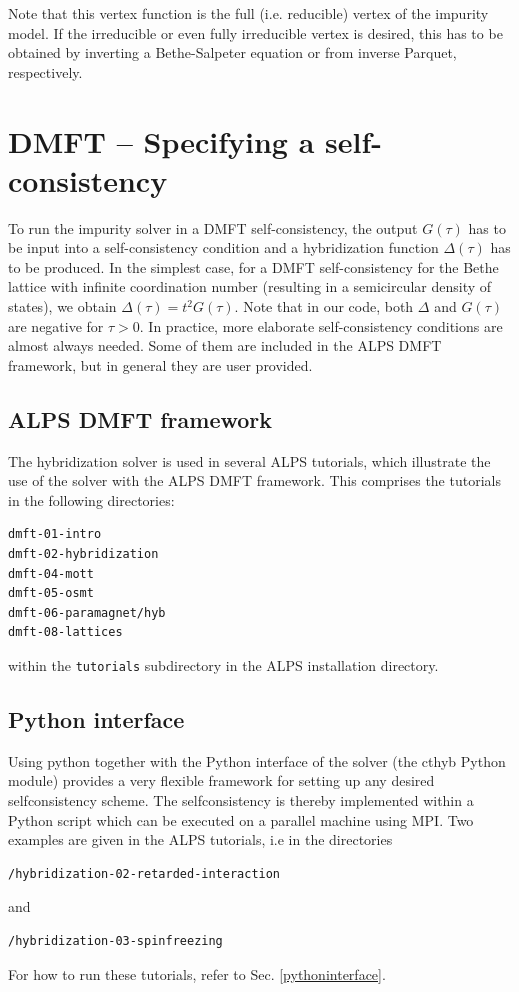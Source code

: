 \documentclass[aps,prb,floatfix,superscriptaddress,twocolumn,notitlepage]{revtex4-1}
\begin{document}
Note that this vertex function is the full (i.e. reducible) vertex of the impurity model. If the irreducible or even fully irreducible vertex is desired, this has to be obtained by inverting a Bethe-Salpeter equation or from inverse Parquet, respectively.

\section{DMFT -- Specifying a self-consistency}
To run the impurity solver in a DMFT self-consistency, the output $G(\tau)$ has to be input into a self-consistency condition and a hybridization function $\Delta(\tau)$ has to be produced.\cite{Georges96,Kotliar06} In the simplest case, for a DMFT self-consistency for the Bethe lattice with infinite coordination number (resulting in a semicircular density of states), we obtain $\Delta(\tau)=t^2G(\tau)$.
Note that in our code, both $\Delta$ and $G(\tau)$ are negative for $\tau>0$.
In practice, more elaborate self-consistency conditions are almost always needed. 
Some of them are included in the ALPS DMFT framework, but in general they are user provided.

\subsection{ALPS DMFT framework}

The hybridization solver is used in several ALPS tutorials, which illustrate the use of the solver with the ALPS DMFT framework. This comprises the tutorials in the following directories:
\begin{verbatim}
dmft-01-intro
dmft-02-hybridization
dmft-04-mott
dmft-05-osmt
dmft-06-paramagnet/hyb
dmft-08-lattices
\end{verbatim}
within the \verb#tutorials# subdirectory in the ALPS installation directory.

\subsection{Python interface}

Using python together with the Python interface of the solver (the cthyb Python module) provides a very flexible framework for setting up any desired selfconsistency scheme.
The selfconsistency is thereby implemented within a Python script which can be executed on a parallel machine using MPI.
Two examples are given in the ALPS tutorials, i.e in the directories
\begin{verbatim}
/hybridization-02-retarded-interaction
\end{verbatim}
and
\begin{verbatim}
/hybridization-03-spinfreezing
\end{verbatim}
For how to run these tutorials, refer to Sec. \ref{pythoninterface}.
\end{document}
